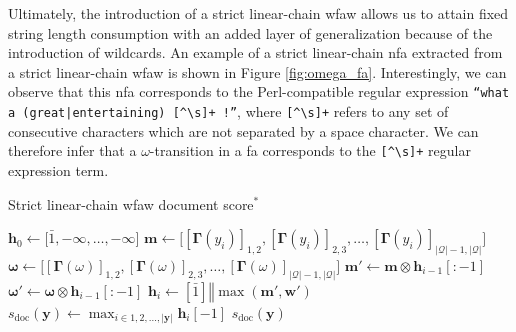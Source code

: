Ultimately, the introduction of a strict linear-chain \ac{wfaw} allows us to
attain fixed string length consumption with an added layer of generalization
because of the introduction of wildcards. An example of a strict linear-chain
\ac{nfa} extracted from a strict linear-chain \ac{wfaw} is shown in Figure
\ref{fig:omega_fa}. Interestingly, we can observe that this \ac{nfa} corresponds to
the Perl-compatible regular expression \texttt{``what a (great|entertaining)
  [\^{}\textbackslash s]+ !''}, where
\texttt{[\^{}\textbackslash s]+} refers to any set of consecutive
characters which are not separated by a space character. We can therefore infer
that a $\omega$-transition in a \ac{fa} corresponds to the
\texttt{[\^{}\textbackslash s]+} regular expression term.

\begin{algorithm}[t!]
  \small
  \caption{Strict linear-chain \ac{wfaw} document score$^*$}
  \label{algo:lc_wfa_w_document_score}
  \begin{algorithmic}[1]
    \Statex
    \State $\bm{h}_0 \gets \big[\bar{1}, -\infty, \ldots, -\infty\big]$ 
     
    \State $\bm{m} \gets \big[[\bm{\Gamma}(y_i)]_{1,2}, [\bm{\Gamma}(y_i)]_{2,3}, \ldots,
    [\bm{\Gamma}(y_i)]_{|\mathcal{Q}|-1,|\mathcal{Q}|}\big]$ 
    \State $\bm{\omega} \gets \big[[\bm{\Gamma}(\omega)]_{1,2}, [\bm{\Gamma}(\omega)]_{2,3}, \ldots,
    [\bm{\Gamma}(\omega)]_{|\mathcal{Q}|-1,|\mathcal{Q}|}\big]$
    \State $\bm{m'} \gets \bm{m} \otimes \bm{h}_{i-1}[:-1]$ 
    \State $\bm{\omega'} \gets \bm{\omega} \otimes \bm{h}_{i-1}[:-1]$ 
    \State $\bm{h}_{i} \gets [\bar{1}] \mathbin\Vert \max(\bm{m'}, \bm{w'})$
    \EndFor
    \State $s_{\text{doc}}(\bm{y}) \gets  \max_{i \in 1,2,...,|\bm{y}|}
    \bm{h}_{i}[-1]$
    \State \Return $s_{\text{doc}}(\bm{y})$
    \EndFunction
  \end{algorithmic}
\end{algorithm}

